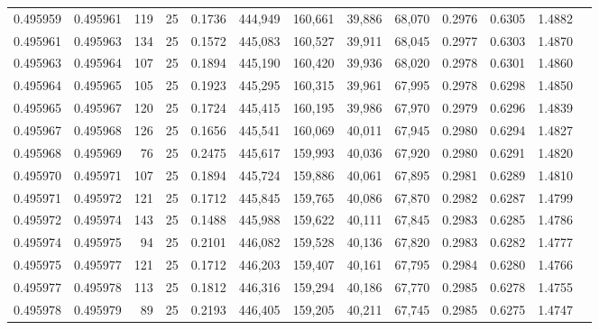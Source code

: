 \begin{tabular}{rrrrrrrrrrrrr}
0.495959 & 0.495961 &   119 &  25 &                                     0.1736 & 444,949 & 160,661 &  39,886 &  68,070 & 0.2976 & 0.6305 & 1.4882 \\
0.495961 & 0.495963 &   134 &  25 &                                     0.1572 & 445,083 & 160,527 &  39,911 &  68,045 & 0.2977 & 0.6303 & 1.4870 \\
0.495963 & 0.495964 &   107 &  25 &                                     0.1894 & 445,190 & 160,420 &  39,936 &  68,020 & 0.2978 & 0.6301 & 1.4860 \\
0.495964 & 0.495965 &   105 &  25 &                                     0.1923 & 445,295 & 160,315 &  39,961 &  67,995 & 0.2978 & 0.6298 & 1.4850 \\
0.495965 & 0.495967 &   120 &  25 &                                     0.1724 & 445,415 & 160,195 &  39,986 &  67,970 & 0.2979 & 0.6296 & 1.4839 \\
0.495967 & 0.495968 &   126 &  25 &                                     0.1656 & 445,541 & 160,069 &  40,011 &  67,945 & 0.2980 & 0.6294 & 1.4827 \\
0.495968 & 0.495969 &    76 &  25 &                                     0.2475 & 445,617 & 159,993 &  40,036 &  67,920 & 0.2980 & 0.6291 & 1.4820 \\
0.495970 & 0.495971 &   107 &  25 &                                     0.1894 & 445,724 & 159,886 &  40,061 &  67,895 & 0.2981 & 0.6289 & 1.4810 \\
0.495971 & 0.495972 &   121 &  25 &                                     0.1712 & 445,845 & 159,765 &  40,086 &  67,870 & 0.2982 & 0.6287 & 1.4799 \\
0.495972 & 0.495974 &   143 &  25 &                                     0.1488 & 445,988 & 159,622 &  40,111 &  67,845 & 0.2983 & 0.6285 & 1.4786 \\
0.495974 & 0.495975 &    94 &  25 &                                     0.2101 & 446,082 & 159,528 &  40,136 &  67,820 & 0.2983 & 0.6282 & 1.4777 \\
0.495975 & 0.495977 &   121 &  25 &                                     0.1712 & 446,203 & 159,407 &  40,161 &  67,795 & 0.2984 & 0.6280 & 1.4766 \\
0.495977 & 0.495978 &   113 &  25 &                                     0.1812 & 446,316 & 159,294 &  40,186 &  67,770 & 0.2985 & 0.6278 & 1.4755 \\
0.495978 & 0.495979 &    89 &  25 &                                     0.2193 & 446,405 & 159,205 &  40,211 &  67,745 & 0.2985 & 0.6275 & 1.4747 \\

\end{tabular}
